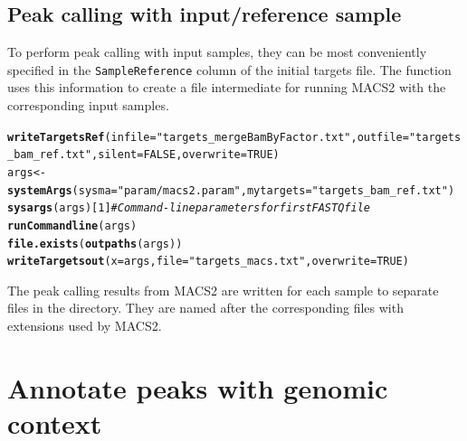 \documentclass{article}\usepackage[]{graphicx}\usepackage[]{color}
\makeatletter
\newcommand{\hlnum}[1]{\textcolor[rgb]{0.686,0.059,0.569}{#1}}%
\newcommand{\hlstr}[1]{\textcolor[rgb]{0.192,0.494,0.8}{#1}}%
\newcommand{\hlcom}[1]{\textcolor[rgb]{0.678,0.584,0.686}{\textit{#1}}}%
\newcommand{\hlstd}[1]{\textcolor[rgb]{0.345,0.345,0.345}{#1}}%
\newcommand{\hlkwb}[1]{\textcolor[rgb]{0.69,0.353,0.396}{#1}}%
\newcommand{\hlkwc}[1]{\textcolor[rgb]{0.333,0.667,0.333}{#1}}%
\newcommand{\hlkwd}[1]{\textcolor[rgb]{0.737,0.353,0.396}{\textbf{#1}}}%
\newenvironment{kframe}{%
 \def\at@end@of@kframe{}%
 \ifinner\ifhmode%
  \def\at@end@of@kframe{\end{minipage}}%
  \begin{minipage}{\columnwidth}%
 \fi\fi%
 \def\FrameCommand##1{\hskip\@totalleftmargin \hskip-\fboxsep
 \colorbox{shadecolor}{##1}\hskip-\fboxsep
     \hskip-\linewidth \hskip-\@totalleftmargin \hskip\columnwidth}%
 \MakeFramed {\advance\hsize-\width
   \@totalleftmargin\z@ \linewidth\hsize
   \@setminipage}}%
 {\par\unskip\endMakeFramed%
 \at@end@of@kframe}
\newenvironment{knitrout}{}{} %
\newcommand{\Rfunarg}[1]{{\texttt{#1}}}
\makeatother
\begin{document}
\subsection{Peak calling with input/reference sample}
To perform peak calling with input samples, they can be most conveniently specified in the \Rfunarg{SampleReference} column of the initial targets file. The function  uses this information to create a  file intermediate for running MACS2 with the corresponding input samples.  
\begin{knitrout}
\color{fgcolor}\begin{kframe}
\begin{alltt}
\hlkwd{writeTargetsRef}\hlstd{(}\hlkwc{infile}\hlstd{=}\hlstr{"targets_mergeBamByFactor.txt"}\hlstd{,} \hlkwc{outfile}\hlstd{=}\hlstr{"targets_bam_ref.txt"}\hlstd{,} \hlkwc{silent}\hlstd{=}\hlnum{FALSE}\hlstd{,} \hlkwc{overwrite}\hlstd{=}\hlnum{TRUE}\hlstd{)}
\hlstd{args} \hlkwb{<-} \hlkwd{systemArgs}\hlstd{(}\hlkwc{sysma}\hlstd{=}\hlstr{"param/macs2.param"}\hlstd{,} \hlkwc{mytargets}\hlstd{=}\hlstr{"targets_bam_ref.txt"}\hlstd{)}
\hlkwd{sysargs}\hlstd{(args)[}\hlnum{1}\hlstd{]} \hlcom{# Command-line parameters for first FASTQ file}
\hlkwd{runCommandline}\hlstd{(args)}
\hlkwd{file.exists}\hlstd{(}\hlkwd{outpaths}\hlstd{(args))}
\hlkwd{writeTargetsout}\hlstd{(}\hlkwc{x}\hlstd{=args,} \hlkwc{file}\hlstd{=}\hlstr{"targets_macs.txt"}\hlstd{,} \hlkwc{overwrite}\hlstd{=}\hlnum{TRUE}\hlstd{)}
\end{alltt}
\end{kframe}
\end{knitrout}

The peak calling results from MACS2 are written for each sample to separate files in the  directory. They are named after the corresponding  files with extensions used by MACS2.

\section{Annotate peaks with genomic context}
\end{document}

